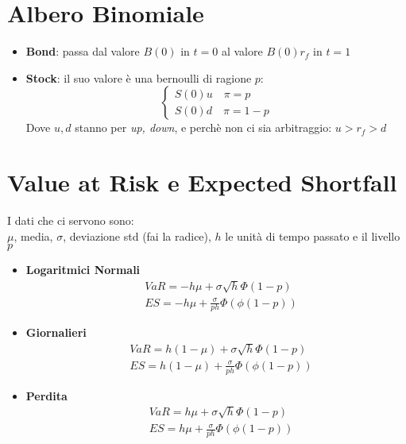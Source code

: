 \documentclass[a4paper,notitlepage]{report}%
\begin{document}
\begin{multicols*}{2}
    \section*{Albero Binomiale}
        \begin{itemize}
            \item \textbf{Bond}: passa dal valore $B(0)$ in $t=0$ al valore $B(0)r_f$ in $t=1$
            \item \textbf{Stock}: il suo valore è una bernoulli di ragione $p$:
                \[
                    \left\{\begin{array}{l}
                        S(0)u \quad \pi = p \\
                        S(0)d \quad \pi = 1-p
                    \end{array}\right.
                \]
                Dove $u,d$ stanno per \textit{up, down},
                e perchè non ci sia arbitraggio: $u>r_f>d$
        \end{itemize}


\section*{Value at Risk e Expected Shortfall}
    I dati che ci servono sono: \\
    $\mu$, media, $\sigma$, deviazione std (fai la radice),
    $h$ le unità di tempo passato e il livello $p$
    \begin{itemize}
        \item \textbf{Logaritmici Normali} 
            \begin{align*}
                &VaR = -h\mu+\sigma\sqrt{h}\Phi(1-p) \\
                &ES = -h\mu+\frac{\sigma}{ph} \Phi(\phi(1-p))
            \end{align*}
        \item \textbf{Giornalieri}
            \begin{align*}
                &VaR = h(1-\mu)+\sigma\sqrt{h}\Phi(1-p) \\
                &ES = h(1-\mu)+\frac{\sigma}{ph} \Phi(\phi(1-p))
            \end{align*}
        \item \textbf{Perdita}
            \begin{align*}
                &VaR = h\mu+\sigma\sqrt{h}\Phi(1-p) \\
                &ES = h\mu+\frac{\sigma}{ph} \Phi(\phi(1-p))
            \end{align*}
    \end{itemize}


\end{multicols*}
\end{document}
